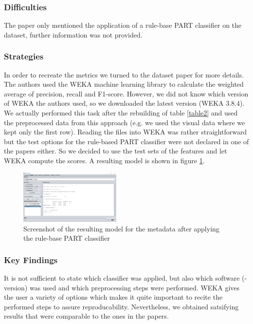 \subsubsection*{Difficulties}

The paper \cite{Riegler2016} only mentioned the application of a rule-base PART classifier on the dataset, further information was not provided.

\subsubsection*{Strategies}

In order to recreate the metrics we turned to the dataset paper \cite{Wang2016} for more details. The authors used the WEKA machine learning library to calculate the weighted average of precision, recall and F1-score. \newline
However, we did not know which version of WEKA the authors used, so we downloaded the latest version (WEKA 3.8.4). \newline
We actually performed this task after the rebuilding of table \ref{table2} and used the preprocessed data from this approach (e.g. we used the visual data where we kept only the first row). Reading the files into WEKA was rather straightforward but the test options for the rule-based PART classifier were not declared in one of the papers either. So we decided to use the test sets of the features and let WEKA compute the scores. A resulting model is shown in figure \ref{weka}.

\begin{figure}[h]
	\includegraphics[width=0.45\textwidth]{weka.png}
	\caption{Screenshot of the resulting model for the metadata after applying the rule-base PART classifier}
	\label{weka}
\end{figure}


\subsubsection*{Key Findings}

It is not sufficient to state which classifier was applied, but also which software (-version) was used and which preprocessing steps were performed. WEKA gives the user a variety of options which makes it quite important to recite the performed steps to assure reproducability. \newline
Nevertheless, we obtained satsifying results that were comparable to the ones in the papers.

